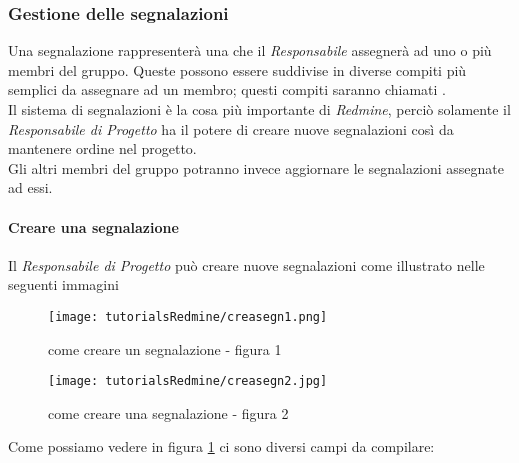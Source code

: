 \documentclass{scalatekids-article}
\begin{document}
\subsubsection{Gestione delle segnalazioni}
Una segnalazione rappresenterà una  che il \textit{Responsabile} assegnerà ad uno o più membri del gruppo. Queste  possono essere suddivise in diverse compiti più semplici da assegnare ad un membro; questi compiti saranno chiamati .\\
Il sistema di segnalazioni è la cosa più importante di \textit{Redmine}, perciò solamente il \textit{Responsabile di Progetto} ha il potere di creare nuove segnalazioni così da mantenere ordine nel progetto. \\Gli altri membri del gruppo potranno invece aggiornare le segnalazioni assegnate ad essi.
\paragraph{Creare una segnalazione}
Il \textit{Responsabile di Progetto} può creare nuove segnalazioni come illustrato nelle seguenti immagini
\begin{figure}[H]
  \centering
  \texttt{[image: tutorialsRedmine/creasegn1.png]}
  \caption{come creare un segnalazione - figura 1}
\end{figure}
\begin{figure}[H]
  \centering
  \texttt{[image: tutorialsRedmine/creasegn2.jpg]}
  \caption{come creare una segnalazione - figura 2\label{fig:crea-segnalazione-2}}
\end{figure}
Come possiamo vedere in figura \ref{fig:crea-segnalazione-2} ci sono diversi campi da compilare:
\end{document}
